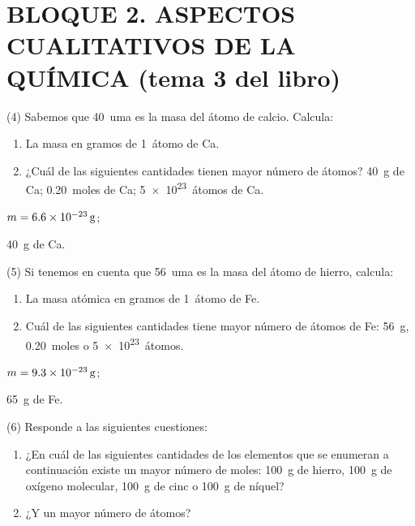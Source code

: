 \documentclass[10pt]{article}
\begin{document}
\section{BLOQUE 2. ASPECTOS CUALITATIVOS DE LA QUÍMICA (tema 3 del libro)}

\begin{multicols}{2}

\begin{exercise}
(4) Sabemos que \SI{40}{uma} es la masa del átomo de calcio. Calcula:
  \begin{enumerate}
    \item La masa en gramos de \SI{1}{átomo} de Ca.
    \item ¿Cuál de las siguientes cantidades tienen mayor número de átomos? \SI{40}{g} de Ca; \SI{0,20}{moles} de Ca; \SI{5e23}{átomos} de Ca.
  \end{enumerate}
\end{exercise}

\begin{solution}
  \begin{enumerate*}
    \item \( m = \SI{6,6E-23}{\gram} \);
    \item \SI{40}{\gram} de Ca.
  \end{enumerate*}
\end{solution}

\begin{exercise}
  (5) Si tenemos en cuenta que \SI{56}{uma} es la masa del átomo de hierro, calcula:
  \begin{enumerate}
    \item La masa atómica en gramos de \SI{1}{átomo} de Fe.
    \item Cuál de las siguientes cantidades tiene mayor número de átomos de Fe: \SI{56}{\gram}, \SI{0,20}{moles} o \SI{5e23}{átomos}.
  \end{enumerate}
\end{exercise}

\begin{solution}
  \begin{enumerate*}
    \item \( m = \SI{9,3E-23}{\gram} \);
    \item \SI{65}{\gram} de Fe.
  \end{enumerate*}
\end{solution}

\begin{exercise}
  (6) Responde a las siguientes cuestiones:
  \begin{enumerate}
    \item ¿En cuál de las siguientes cantidades de los elementos que se enumeran a continuación existe un mayor número de moles: \SI{100}{\gram} de hierro, \SI{100}{\gram} de oxígeno molecular, \SI{100}{\gram} de cinc o \SI{100}{\gram} de níquel?
    \item ¿Y un mayor número de átomos?
  \end{enumerate}
\end{exercise}


\end{multicols}
\end{document}
